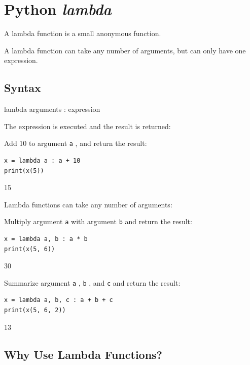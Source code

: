 \documentclass[12pt,a4paper]{article}
\newcommand{\lcode}[1]{%
	\lstinline{#1}%
}
\begin{document}
\section{Python \textit{lambda}}

A lambda function is a small anonymous function.

A lambda function can take any number of arguments, but can only have one
expression.

\subsection*{Syntax}

\begin{vercode}
lambda arguments : expression
\end{vercode}

The expression is executed and the result is returned:

\begin{ebox}
Add 10 to argument \lcode{a}, and return the result:
	\begin{lstlisting}
x = lambda a : a + 10
print(x(5))
	\end{lstlisting}
\tcblower
	\begin{vercode}
15
	\end{vercode}
\end{ebox}

Lambda functions can take any number of arguments:

\begin{ebox}
Multiply argument \lcode{a} with argument \lcode{b} and return the result:
	\begin{lstlisting}
x = lambda a, b : a * b
print(x(5, 6))
	\end{lstlisting}
\tcblower
	\begin{vercode}
30
	\end{vercode}
\end{ebox}

\begin{ebox}
Summarize argument \lcode{a}, \lcode{b}, and \lcode{c} and return the result:
	\begin{lstlisting}
x = lambda a, b, c : a + b + c
print(x(5, 6, 2)) 
	\end{lstlisting}
\tcblower
	\begin{vercode}
13
	\end{vercode}
\end{ebox}
\subsection{Why Use Lambda Functions?}
\end{document}
